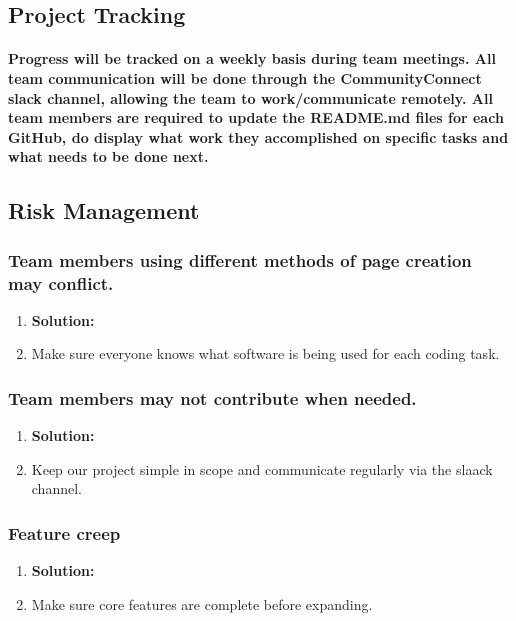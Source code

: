 \documentclass[12pt]{article}
\begin{document}
	\subsection{\bf Project Tracking}
		\paragraph{\normalfont \indent Progress will be tracked on a weekly basis during team meetings. All team communication will be done through the CommunityConnect slack channel, allowing the team to work/communicate remotely. All team members are required to update the README.md files for each GitHub, do display what work they accomplished on specific tasks and what needs to be done next.
    }

	\subsection{\bf Risk Management}
		\subsubsection{\normalfont Team members using different methods of page creation may conflict.}
			\begin{enumerate}
				\item \bf Solution:
				\item Make sure everyone knows what software is being used for each coding task.
			\end{enumerate}
		\subsubsection{\normalfont Team members may not contribute when needed.}
			\begin{enumerate}
				\item \bf Solution:
				\item Keep our project simple in scope and communicate regularly via the slaack channel.
			\end{enumerate}
		\subsubsection{\normalfont Feature creep}
			\begin{enumerate}
				\item \bf Solution:
				\item Make sure core features are complete before expanding.
			\end{enumerate}
\end{document}
